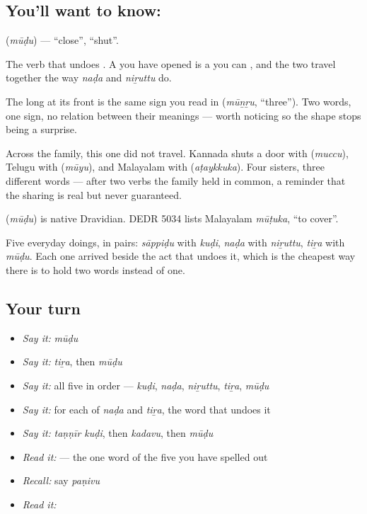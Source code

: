 \subsection*{You'll want to know: }
\textbf{} (\emph{mūḍu}) — \textquotedblleft{}close\textquotedblright{}, \textquotedblleft{}shut\textquotedblright{}.

The verb that undoes . A  you have opened is a  you can , and the two travel together the way \emph{naḍa} and \emph{niṟuttu} do.

The long \textbf{} at its front is the same sign you read in \textbf{} (\emph{mūṉṟu}, \textquotedblleft{}three\textquotedblright{}). Two words, one sign, no relation between their meanings — worth noticing so the shape stops being a surprise.

Across the family, this one did not travel. Kannada shuts a door with  (\emph{muccu}), Telugu with  (\emph{mūyu}), and Malayalam with  (\emph{aṭaykkuka}). Four sisters, three different words — after two verbs the family held in common, a reminder that the sharing is real but never guaranteed.

\begin{cousinweb}
\textbf{} (\emph{mūḍu}) is native Dravidian. DEDR 5034 lists Malayalam \emph{mūṭuka}, \textquotedblleft{}to cover\textquotedblright{}.
\end{cousinweb}

\begin{grammarlens}[title={What you've built}]
Five everyday doings, in pairs: \emph{sāppiḍu} with \emph{kuḍi}, \emph{naḍa} with \emph{niṟuttu}, \emph{tiṟa} with \emph{mūḍu}. Each one arrived beside the act that undoes it, which is the cheapest way there is to hold two words instead of one.
\end{grammarlens}

\subsection*{Your turn}
\begin{itemize}
\raggedright
  \item \emph{Say it:} \emph{mūḍu}
  \item \emph{Say it:} \emph{tiṟa}, then \emph{mūḍu}
  \item \emph{Say it:} all five in order — \emph{kuḍi}, \emph{naḍa}, \emph{niṟuttu}, \emph{tiṟa}, \emph{mūḍu}
  \item \emph{Say it:} for each of \emph{naḍa} and \emph{tiṟa}, the word that undoes it
  \item \emph{Say it:} \emph{taṇṇīr kuḍi}, then \emph{kadavu}, then \emph{mūḍu}
  \item \emph{Read it:} \textbf{} — the one word of the five you have spelled out
  \item \emph{Recall:} say \emph{paṇivu}
  \item \emph{Read it:} \textbf{}
\end{itemize}

